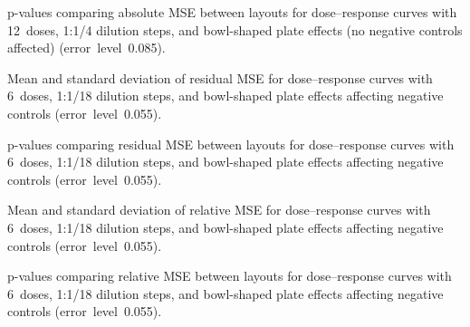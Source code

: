 \begin{table}[p]
    \centering
    \small
    
    \caption{p-values comparing absolute \ECIC{} MSE between layouts for dose--response curves with 12~doses, 1:1/4 dilution steps, and bowl-shaped plate effects (no negative controls affected) (error~level~0.085).}
    \label{tab:dr-absic50-pvalues-12doses-dil4-bowl-0.085}
\end{table}

\begin{table}[p]
    \centering
    \small
    
    \caption{Mean and standard deviation of residual MSE for dose--response curves with 6~doses, 1:1/18 dilution steps, and bowl-shaped plate effects affecting negative controls (error~level~0.055).}
    \label{tab:dr-residuals-mean-std-6doses-dil18-bowl-neg-controls-0.055}
\end{table}

\begin{table}[p]
    \centering
    \small
    
    \caption{p-values comparing residual MSE between layouts for dose--response curves with 6~doses, 1:1/18 dilution steps, and bowl-shaped plate effects affecting negative controls (error~level~0.055).}
    \label{tab:dr-residuals-pvalues-6doses-dil18-bowl-neg-controls-0.055}
\end{table}

\begin{table}[p]
    \centering
    \small
    
    \caption{Mean and standard deviation of relative \ECIC{} MSE for dose--response curves with 6~doses, 1:1/18 dilution steps, and bowl-shaped plate effects affecting negative controls (error~level~0.055).}
    \label{tab:dr-relic50-mean-std-6doses-dil18-bowl-neg-controls-0.055}
\end{table}

\begin{table}[p]
    \centering
    \small
    
    \caption{p-values comparing relative \ECIC{} MSE between layouts for dose--response curves with 6~doses, 1:1/18 dilution steps, and bowl-shaped plate effects affecting negative controls (error~level~0.055).}
    \label{tab:dr-relic50-pvalues-6doses-dil18-bowl-neg-controls-0.055}
\end{table}


